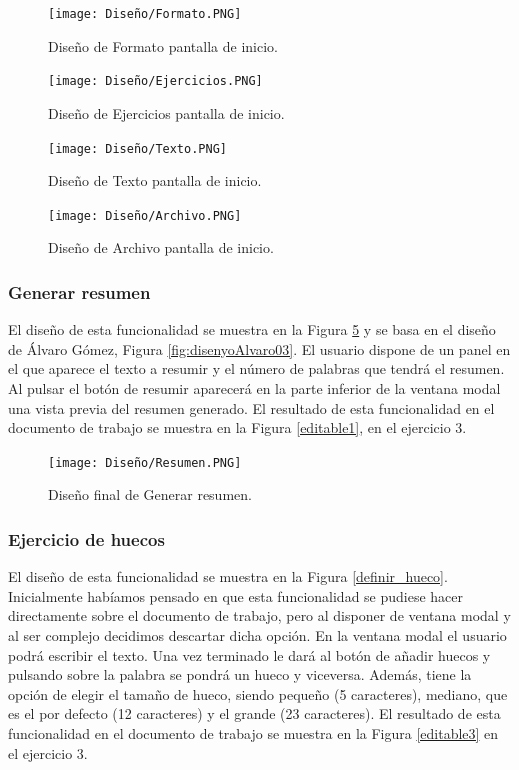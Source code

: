 \begin{figure}[ht!]
  \centering
  \texttt{[image: Diseño/Formato.PNG]}
  \caption{Diseño de Formato pantalla de inicio.}
  \label{Forato}
\end{figure}

\begin{figure}[ht!]
  \centering
  \texttt{[image: Diseño/Ejercicios.PNG]}
  \caption{Diseño de Ejercicios pantalla de inicio.}
  \label{ejercicios}
\end{figure}

\begin{figure}[ht!]
  \centering
  \texttt{[image: Diseño/Texto.PNG]}
  \caption{Diseño de Texto pantalla de inicio.}
  \label{texto}
\end{figure}

\begin{figure}[ht!]
  \centering
  \texttt{[image: Diseño/Archivo.PNG]}
  \caption{Diseño de Archivo pantalla de inicio.}
  \label{archivo}
\end{figure}

\subsubsection{Generar resumen}
El diseño de esta funcionalidad se muestra en la Figura \ref{resuemn} y se basa en el diseño de Álvaro Gómez, Figura \ref{fig:disenyoAlvaro03}. El usuario dispone de un panel en el que aparece el texto a resumir y el número de palabras que tendrá el resumen. Al pulsar el botón de resumir aparecerá en la parte inferior de la ventana modal una vista previa del resumen generado. El resultado de esta funcionalidad en el documento de trabajo se muestra en la Figura \ref{editable1}, en el ejercicio 3.

\begin{figure}[ht!]
  \centering
  \texttt{[image: Diseño/Resumen.PNG]}
  \caption{Diseño final de Generar resumen.}
  \label{resuemn}
\end{figure}

\subsubsection{Ejercicio de huecos}
El diseño de esta funcionalidad se muestra en la Figura \ref{definir_hueco}. Inicialmente habíamos pensado en que esta funcionalidad se pudiese hacer directamente sobre el documento de trabajo, pero al disponer de ventana modal y al ser complejo decidimos descartar dicha opción. En la ventana modal el usuario podrá escribir el texto. Una vez terminado le dará al botón de añadir huecos y pulsando sobre la palabra se pondrá un hueco y viceversa. Además, tiene la opción de elegir el tamaño de hueco, siendo pequeño (5 caracteres), mediano, que es el por defecto (12 caracteres) y el grande (23 caracteres). El resultado de esta funcionalidad en el documento de trabajo se muestra en la Figura \ref{editable3} en el ejercicio 3.

